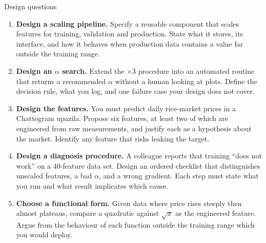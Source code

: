 \documentclass[aspectratio=169,10pt]{beamer}
\begin{document}
\begin{frame}{Design questions}
  \footnotesize
  \begin{enumerate}
    \item \textbf{Design a scaling pipeline.} Specify a reusable component that scales
          features for training, validation and production. State what it stores, its
          interface, and how it behaves when production data contains a value far outside
          the training range. \hfill{}
    \item \textbf{Design an $\alpha$ search.} Extend the $\times 3$ procedure into an
          automated routine that returns a recommended $\alpha$ without a human looking at
          plots. Define the decision rule, what you log, and one failure case your design
          does not cover. \hfill{}
    \item \textbf{Design the features.} You must predict daily rice-market prices in a
          Chattogram upazila. Propose six features, at least two of which are engineered
          from raw measurements, and justify each as a hypothesis about the market. Identify
          any feature that risks leaking the target. \hfill{}
    \item \textbf{Design a diagnosis procedure.} A colleague reports that training ``does not
          work'' on a 40-feature data set. Design an ordered checklist that distinguishes
          unscaled features, a bad $\alpha$, and a wrong gradient. Each step must state what
          you run and what result implicates which cause. \hfill{}
    \item \textbf{Choose a functional form.} Given data where price rises steeply then almost
          plateaus, compare a quadratic against $\sqrt{x}$ as the engineered feature. Argue
          from the behaviour of each function outside the training range which you would
          deploy. \hfill{}
  \end{enumerate}
\end{frame}
\end{document}
